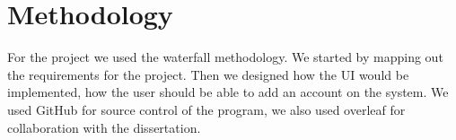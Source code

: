 
\chapter{Methodology}
For the project we used the waterfall methodology. We started by mapping out the requirements for the project. Then we designed how the UI would be implemented, how the user should be able to add an account on the system.  We used GitHub for source control of the program, we also used overleaf for collaboration with the dissertation. 